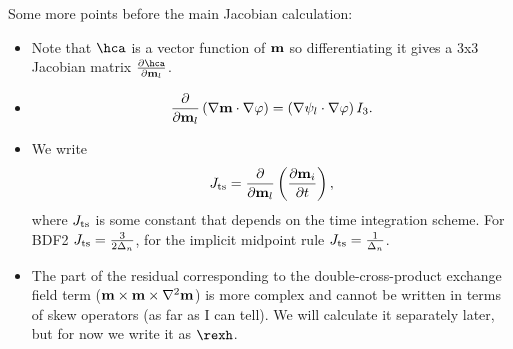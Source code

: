 Some more points before the main Jacobian calculation:

\begin{itemize}
\item Note that $\hca$ is a vector function of $\mathbf{m}$ so differentiating it gives a 3x3 Jacobian matrix  $\pd{\hca}{\mv_l}$.

\item  \begin{equation}
    \frac{\partial }{\partial \mathbf{m}_l} \left(\nabla \mathbf{m} \cdot \nabla \varphi\right) =
    \left(\nabla \psi_l \cdot \nabla \varphi \right) I_3.
  \end{equation}

\item We write
  \begin{equation}
    J_\text{ts} = \frac{\partial }{\partial \mathbf{m}_l} \left(\frac{\partial \mathbf{m}_i}{\partial t} \right),
  \end{equation}
  where $J_\text{ts}$ is some constant that depends on the time integration scheme.
  For BDF2 $J_\text{ts} = \frac{3}{2\Delta_{n}}$, for the implicit midpoint rule $J_\text{ts} = \frac{1}{\Delta_{n}}$.
\item The part of the residual corresponding to the double-cross-product exchange field term ($\mathbf{m} \times \mathbf{m} \times \nabla^2 \mathbf{m}$) is more complex and cannot be written in terms of skew operators (as far as I can tell).
  We will calculate it separately later, but for now we write it as $\rexh$.
\end{itemize}


